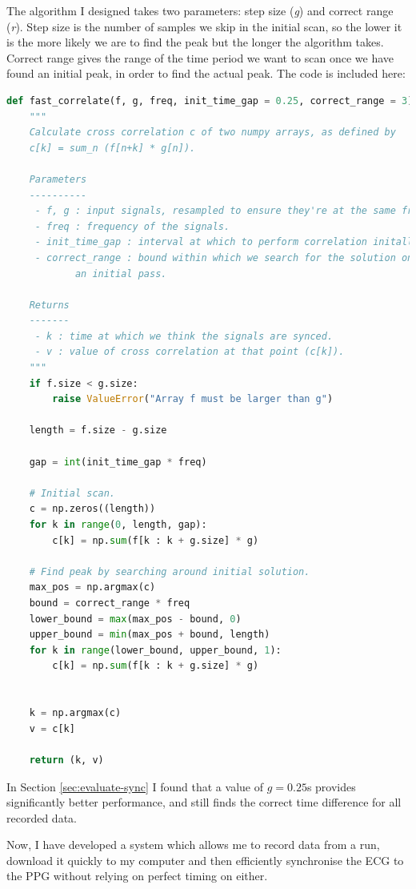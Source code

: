 \documentclass[12pt,a4paper,twoside,openany]{report}
\begin{document}
The algorithm I designed takes two parameters: step size (\emph{g}) and
correct range (\emph{r}). Step size is the number of samples we skip in the initial scan, so the
lower it is the more likely we are to find the peak but the longer the
algorithm takes. Correct range gives the range of the time period we want to
scan once we have found an initial peak, in order to find the actual peak. The
code is included here:
\begin{lstlisting}[language=Python]
def fast_correlate(f, g, freq, init_time_gap = 0.25, correct_range = 3):
    """
    Calculate cross correlation c of two numpy arrays, as defined by 
    c[k] = sum_n (f[n+k] * g[n]).

    Parameters
    ----------
     - f, g : input signals, resampled to ensure they're at the same frequency.
     - freq : frequency of the signals.
     - init_time_gap : interval at which to perform correlation initally in seconds. 
     - correct_range : bound within which we search for the solution once we have made 
    		an initial pass.

    Returns
    -------
     - k : time at which we think the signals are synced. 
     - v : value of cross correlation at that point (c[k]).
    """
    if f.size < g.size:
        raise ValueError("Array f must be larger than g")

    length = f.size - g.size

    gap = int(init_time_gap * freq)

    # Initial scan.
    c = np.zeros((length))
    for k in range(0, length, gap):
        c[k] = np.sum(f[k : k + g.size] * g)

    # Find peak by searching around initial solution.
    max_pos = np.argmax(c)
    bound = correct_range * freq
    lower_bound = max(max_pos - bound, 0)
    upper_bound = min(max_pos + bound, length)
    for k in range(lower_bound, upper_bound, 1):
        c[k] = np.sum(f[k : k + g.size] * g)


    k = np.argmax(c)
    v = c[k]

    return (k, v)
\end{lstlisting}

In Section \ref{sec:evaluate-sync} I found that a value of \(g=0.25\)s
provides significantly better performance, and still finds the correct time
difference for all recorded data.

Now, I have developed a system which allows me to record data from a run,
download it quickly to my computer and then efficiently synchronise the ECG to the PPG
without relying on perfect timing on either.
\end{document}
